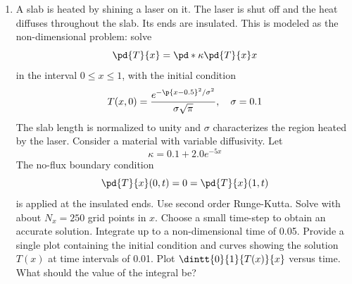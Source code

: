 \documentclass[11pt, oneside]{article}
\begin{document}
\begin{enumerate}
  \item %
    A slab is heated by shining a laser on it.
    The laser is shut off and the heat diffuses throughout the slab.
    Its ends are insulated.
    This is modeled as the non-dimensional problem: solve
    \[
      \pd{T}{x} = \pd*{\kappa \pd{T}{x}}{x}
    \]
    in the interval $0 \le x \le 1$, with the initial condition
    \[
      T(x, 0) = \frac{e^{-\p{x - 0.5}^2/\sigma^2}}{\sigma \sqrt{\pi}}, \quad \sigma = 0.1
    \]
    The slab length is normalized to unity and $\sigma$ characterizes the
    region heated by the laser.
    Consider a material with variable diffusivity.
    Let
    \[
      \kappa = 0.1 + 2.0 e^{-5x}
    \]
    The no-flux boundary condition
    \[
      \pd{T}{x}(0, t) = 0 = \pd{T}{x}(1, t)
    \]
    is applied at the insulated ends.
    Use second order Runge-Kutta.
    Solve with about $N_x = 250$ grid points in $x$.
    Choose a small time-step to obtain an accurate solution.
    Integrate up to a non-dimensional time of 0.05.
    Provide a single plot containing the initial condition and curves showing
    the solution $T(x)$ at time intervals of 0.01.
    Plot $\dintt{0}{1}{T(x)}{x}$ versus time.
    What should the value of the integral be?


\end{enumerate}
\end{document}
